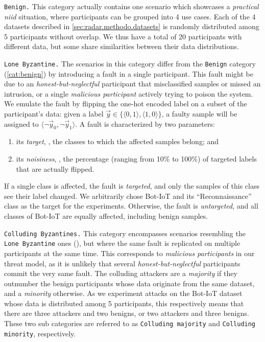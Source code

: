 \begin{categories}
  \item \texttt{Benign.} This category actually contains one scenario which showcases a \emph{practical \gls{niid}} situation, where participants can be grouped into 4 use cases.
  Each of the 4 datasets described in \ref{sec:radar.methodo.datasets} is randomly distributed among 5 participants without overlap.
  We thus have a total of 20 participants with different data, but some share similarities between their data distributions.
  \label{cat:benign}

  \item \texttt{Lone Byzantine.} The scenarios in this category differ from the \texttt{Benign} category (\ref{cat:benign}) by introducing a fault in a single participant.
  This fault might be due to an \emph{honest-but-neglectful} participant that misclassified samples or missed an intrusion, or a single \emph{malicious participant} actively trying to poison the system.
  We emulate the fault by flipping the one-hot encoded label on a subset of the participant's data: given a label $\Vec{y} \in \{\langle0,1\rangle,\langle1,0\rangle\}$, a faulty sample will be assigned to $\langle \neg\Vec{y}_0, \neg\Vec{y}_1 \rangle$. 
  A fault is characterized by two parameters: 
  \begin{enumerate}[(1)]
      \item its \emph{target}, \ie, the classes to which the affected samples belong; and 
      \item its \emph{noisiness}, \ie, the percentage (ranging from 10\% to 100\%) of targeted labels that are actually flipped. 
  \end{enumerate}
  If a single class is affected, the fault is \emph{targeted}, and only the samples of this class see their label changed.
  We arbitrarily chose Bot-IoT and its ``Reconnaissance'' class as the target for the experiments.
  Otherwise, the fault is \emph{untargeted}, and all classes of Bot-IoT are equally affected, including benign samples.
  \label{cat:lone}
  
  \item \texttt{Colluding Byzantines.} This category encompasses scenarios resembling the \texttt{Lone Byzantine} ones (), but where the same fault is replicated on multiple participants at the same time.
  This corresponds to \emph{malicious participants} in our threat model, as it is unlikely that several \emph{honest-but-neglectful} participants commit the very same fault.
  The colluding attackers are a \emph{majority} if they outnumber the benign participants whose data originate from the same dataset, and a \emph{minority} otherwise.
  As we experiment attacks on the Bot-IoT dataset whose data is distributed among 5 participants, this respectively means that there are three attackers and two benigns, or two attackers and three benigns.
  These two sub categories are referred to as \texttt{Colluding majority} and \texttt{Colluding minority}, respectively.
  \label{cat:colluding}
\end{categories}

